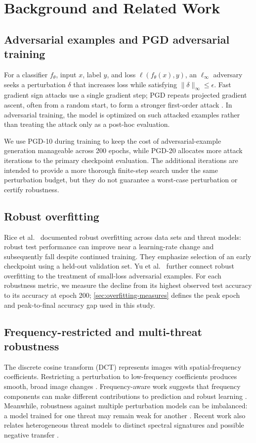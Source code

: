 \documentclass[11pt]{article}
\newcommand{\linf}{\ell_\infty}
\begin{document}
\section{Background and Related Work}
\label{sec:related-work}

\subsection{Adversarial examples and PGD adversarial training}
For a classifier $f_\theta$, input $x$, label $y$, and loss
$\ell(f_\theta(x),y)$, an $\linf$ adversary seeks a perturbation $\delta$
that increases loss while satisfying $\lVert\delta\rVert_\infty\leq\epsilon$.
Fast gradient sign attacks use a single gradient step; PGD repeats projected
gradient ascent, often from a random start, to form a stronger first-order
attack \cite{goodfellow2015,madry2018}. In adversarial training, the model is
optimized on such attacked examples rather than treating the attack only as a
post-hoc evaluation.

We use PGD-10 during training to keep the cost of adversarial-example
generation manageable across 200 epochs, while PGD-20 allocates more attack
iterations to the primary checkpoint evaluation. The additional iterations
are intended to provide a more thorough finite-step search under the same
perturbation budget, but they do not guarantee a worst-case perturbation or
certify robustness.

\subsection{Robust overfitting}
Rice et al.~\cite{rice2020} documented robust overfitting across data sets and
threat models: robust test performance can improve near a learning-rate change
and subsequently fall despite continued training. They emphasize selection of
an early checkpoint using a held-out validation set. Yu et al.~\cite{yu2022}
further connect robust overfitting to the treatment of small-loss adversarial
examples. For each robustness metric, we measure the decline from its highest observed
test accuracy to its accuracy at epoch 200; \cref{sec:overfitting-measures}
defines the peak epoch and peak-to-final accuracy gap used in this study.

\subsection{Frequency-restricted and multi-threat robustness}
The discrete cosine transform (DCT) represents images with spatial-frequency
coefficients. Restricting a perturbation to low-frequency coefficients produces
smooth, broad image changes \cite{guo2020}. Frequency-aware work suggests that
frequency components can make different contributions to prediction and robust
learning \cite{chen2022,bu2023}. Meanwhile, robustness against multiple
perturbation models can be imbalanced: a model trained for one threat may
remain weak for another \cite{tramer2019,maini2020}. Recent work also relates
heterogeneous threat models to distinct spectral signatures and possible
negative transfer \cite{xie2026}.
\end{document}
